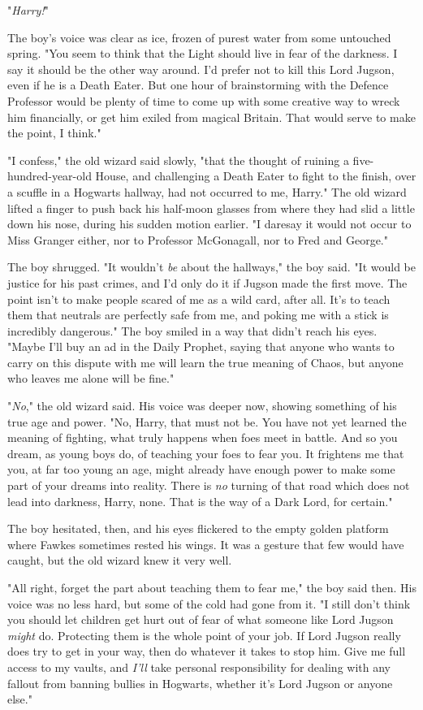 "\emph{Harry!}"

The boy's voice was clear as ice, frozen of purest water from some untouched
spring. "You seem to think that the Light should live in fear of the darkness.
I say it should be the other way around. I'd prefer not to kill this Lord
Jugson, even if he is a Death Eater. But one hour of brainstorming with the
Defence Professor would be plenty of time to come up with some creative way to
wreck him financially, or get him exiled from magical Britain. That would serve
to make the point, I think."

"I confess," the old wizard said slowly, "that the thought of ruining a
five-hundred-year-old House, and challenging a Death Eater to fight to the
finish, over a scuffle in a Hogwarts hallway, had not occurred to me, Harry."
The old wizard lifted a finger to push back his half-moon glasses from where
they had slid a little down his nose, during his sudden motion earlier. "I
daresay it would not occur to Miss Granger either, nor to Professor McGonagall,
nor to Fred and George."

The boy shrugged. "It wouldn't \emph{be} about the hallways," the boy said. "It
would be justice for his past crimes, and I'd only do it if Jugson made the
first move. The point isn't to make people scared of me as a wild card, after
all. It's to teach them that neutrals are perfectly safe from me, and poking me
with a stick is incredibly dangerous." The boy smiled in a way that didn't
reach his eyes. "Maybe I'll buy an ad in the Daily Prophet, saying that anyone
who wants to carry on this dispute with me will learn the true meaning of
Chaos, but anyone who leaves me alone will be fine."

"\emph{No}," the old wizard said. His voice was deeper now, showing something
of his true age and power. "No, Harry, that must not be. You have not yet
learned the meaning of fighting, what truly happens when foes meet in battle.
And so you dream, as young boys do, of teaching your foes to fear you. It
frightens me that you, at far too young an age, might already have enough power
to make some part of your dreams into reality. There is \emph{no} turning of
that road which does not lead into darkness, Harry, none. That is the way of a
Dark Lord, for certain."

The boy hesitated, then, and his eyes flickered to the empty golden platform
where Fawkes sometimes rested his wings. It was a gesture that few would have
caught, but the old wizard knew it very well.

"All right, forget the part about teaching them to fear me," the boy said then.
His voice was no less hard, but some of the cold had gone from it. "I still
don't think you should let children get hurt out of fear of what someone like
Lord Jugson \emph{might} do. Protecting them is the whole point of your job. If
Lord Jugson really does try to get in your way, then do whatever it takes to
stop him. Give me full access to my vaults, and \emph{I'll} take personal
responsibility for dealing with any fallout from banning bullies in Hogwarts,
whether it's Lord Jugson or anyone else."


